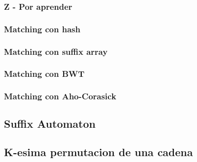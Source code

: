 \subsubsection{Z - Por aprender}

\subsubsection{Matching con hash}

\subsubsection{Matching con suffix array}

\subsubsection{Matching con BWT}

\subsubsection{Matching con Aho-Corasick}
\subsection{Suffix Automaton}

\subsection{K-esima permutacion de una cadena}

